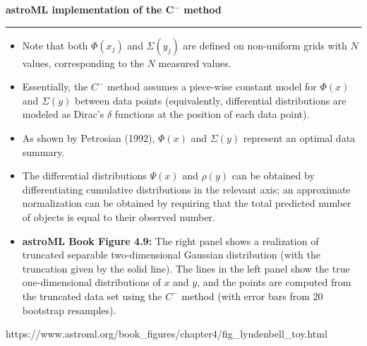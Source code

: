 \documentclass[letterpaper,landscape]{slides}
\begin{document}
\begin{slide}
\begin{center}
\bfseries
{\large {\color{red} astroML implementation of the C$^-$ method}}
\end{center}
\vskip 0.2in
\hrule

\begin{itemize}
\item 
Note that both $\Phi(x_j)$ and $\Sigma(y_j)$ are defined on non-uniform grids with $N$ values,
corresponding to the $N$ measured values. 
\item 
Essentially, the $C^{-}$ method assumes a piece-wise
constant model for $\Phi(x)$ and $\Sigma(y)$ between data points (equivalently, differential distributions
are modeled as Dirac's $\delta$ functions at the position of each data point). 
\item 
As shown by Petrosian (1992), $\Phi(x)$ and $\Sigma(y)$ represent an optimal data summary. 
\item
The differential distributions $\Psi(x)$ and $\rho(y)$ can be obtained by differentiating cumulative 
distributions in the relevant axis; an approximate normalization can be obtained by requiring that 
the total predicted number of objects is equal to their observed number. 
\end{itemize}

\vskip -0.7in
\phantom{x}

\vfill
\end{slide}
 


\begin{slide}

\begin{itemize}
\item {\bf astroML Book Figure 4.9:} 
The right panel shows a realization of truncated separable two-dimensional 
Gaussian distribution (with the truncation given by the solid line).
The lines in the left panel show the true one-dimensional distributions of $x$ 
and $y$, and the points are computed from the truncated data set using the $C^-$ method
(with error bars from 20 bootstrap resamples). 
\end{itemize}

\hskip -0.3in
https://www.astroml.org/book\_figures/chapter4/fig\_lyndenbell\_toy.html
\vskip -0.7in
\phantom{x}

\vfill
\end{slide}
 
\end{document}
